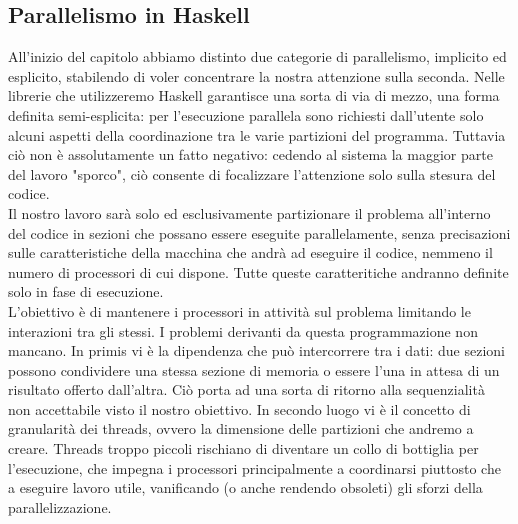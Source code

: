 \subsection{Parallelismo in Haskell}
All'inizio del capitolo abbiamo distinto due categorie di parallelismo, implicito ed esplicito, stabilendo di voler concentrare la nostra attenzione sulla seconda. Nelle librerie che utilizzeremo Haskell garantisce una sorta di via di mezzo, una forma definita semi-esplicita: per l'esecuzione parallela sono richiesti dall'utente solo alcuni aspetti della coordinazione tra le varie partizioni del programma. Tuttavia ciò non è assolutamente un fatto negativo: cedendo al sistema la maggior parte del lavoro "sporco", ciò consente di focalizzare l'attenzione solo sulla stesura del codice.\\
Il nostro lavoro sarà solo ed esclusivamente partizionare il problema all'interno del codice in sezioni che possano essere eseguite parallelamente, senza precisazioni sulle caratteristiche della macchina che andrà ad eseguire il codice, nemmeno il numero di processori di cui dispone. Tutte queste caratteritiche andranno definite solo in fase di esecuzione.\\
L'obiettivo è di mantenere i processori in attività sul problema limitando le interazioni tra gli stessi. I problemi derivanti da questa programmazione non mancano. In primis vi è la dipendenza che può intercorrere tra i dati: due sezioni possono condividere una stessa sezione di memoria o essere l'una in attesa di un risultato offerto dall'altra. Ciò porta ad una sorta di ritorno alla sequenzialità non accettabile visto il nostro obiettivo. In secondo luogo vi è il concetto di granularità dei threads, ovvero la dimensione delle partizioni che andremo a creare. Threads troppo piccoli rischiano di diventare un collo di bottiglia per l'esecuzione, che impegna i processori principalmente a coordinarsi piuttosto che a eseguire lavoro utile, vanificando (o anche rendendo obsoleti) gli sforzi della parallelizzazione.

